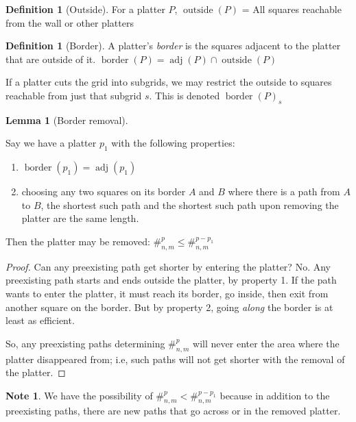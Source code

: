 \documentclass{article}
\theoremstyle{definition}%
\newtheorem{lemma}[theorem]{Lemma}
\newtheorem{definition}[theorem]{Definition}
\newtheorem*{note}{Note}
\newcommand{\newterm}[1]{\textit{#1}}
\newcommand{\adj}{\operatorname{adj}}
\newcommand{\border}{\operatorname{border}}
\newcommand{\outside}{\operatorname{outside}}
\begin{document}
\begin{definition}[Outside]
For a platter $P$, $\outside(P)$ = All squares reachable from the wall or other platters
\end{definition}

\begin{definition}[Border]
A platter's \newterm{border} is the squares adjacent to the platter that are outside of it. $\border(P) = \adj(P) \cap \outside(P)$

If a platter cuts the grid into subgrids, we may restrict the outside to squares reachable from just that subgrid $s$. This is denoted $\border(P)_s$
\end{definition}

\begin{lemma}[Border removal]
\label{lem:Border removal}

Say we have a platter $p_1$ with the following properties:

\begin{enumerate}
\item $\border(p_1) = \adj(p_1)$
\item choosing any two squares on its border $A$ and $B$ where there is a path from $A$ to $B$, the shortest such path and the shortest such path upon removing the platter are the same length.
\end{enumerate}

Then the platter may be removed: $\#^{p}_{n, m} \le \#^{p - p_1}_{n, m}$
\end{lemma}

\begin{proof}
Can any preexisting path get shorter by entering the platter? No. Any preexisting path starts and ends outside the platter, by property 1. If the path wants to enter the platter, it must reach its border, go inside, then exit from another square on the border. But by property 2, going \emph{along} the border is at least as efficient.

So, any preexisting paths determining $\#^{p}_{n, m}$ will never enter the area where the platter disappeared from; i.e, such paths will not get shorter with the removal of the platter.
\end{proof}

\begin{note}
We have the possibility of $\#^{p}_{n, m} < \#^{p - p_1}_{n, m}$ because in addition to the preexisting paths, there are new paths that go across or in the removed platter.
\end{note}
\end{document}
